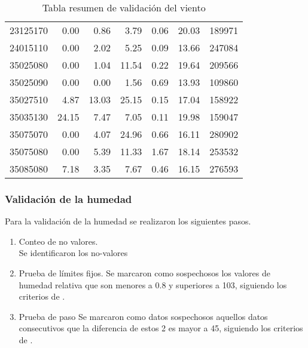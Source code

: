 \documentclass[11pt]{article}
\begin{document}
\begin{table}[H]
\begin{center}
\begin{tabular}{lrrrrrr}
 23125170 &       0.00 &      0.86 &           3.79 &     0.06 &      20.03 &        189971 \\
 24015110 &       0.00 &      2.02 &           5.25 &     0.09 &      13.66 &        247084 \\
 35025080 &       0.00 &      1.04 &          11.54 &     0.22 &      19.64 &        209566 \\
 35025090 &       0.00 &      0.00 &           1.56 &     0.69 &      13.93 &        109860 \\
 35027510 &       4.87 &     13.03 &          25.15 &     0.15 &      17.04 &        158922 \\
 35035130 &      24.15 &      7.47 &           7.05 &     0.11 &      19.98 &        159047 \\
 35075070 &       0.00 &      4.07 &          24.96 &     0.66 &      16.11 &        280902 \\
 35075080 &       0.00 &      5.39 &          11.33 &     1.67 &      18.14 &        253532 \\
 35085080 &       7.18 &      3.35 &           7.67 &     0.46 &      16.15 &        276593 \\
\bottomrule
\end{tabular}
		\caption{Tabla resumen de validación del viento}
		\label{tabla:val_viento}
\end{center}
\end{table}

\subsubsection{Validación de la humedad}

Para la validación de la humedad se realizaron los siguientes pasos.\\

\begin{enumerate}
\item Conteo de no valores.\\
Se identificaron los no-valores
\item Prueba de límites fijos.
Se marcaron como sospechosos los valores de humedad relativa que son menores a 0.8 y superiores a 103, siguiendo los criterios de \citep{estevez2011}.
\item Prueba de paso
Se marcaron como datos sospechosos aquellos datos consecutivos que la diferencia de estos 2 es mayor a 45, siguiendo los criterios de \citep{estevez2011}.
\end{enumerate}
\end{document}

